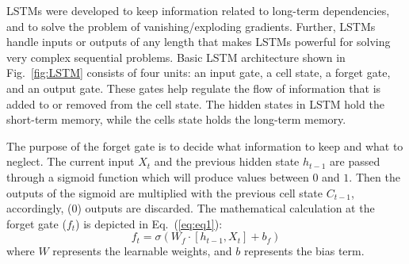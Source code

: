 LSTMs were developed to keep information related to long-term dependencies, and to solve the problem of vanishing/exploding gradients.
Further, LSTMs handle inputs or outputs of any length that makes LSTMs powerful for solving very complex sequential problems. 
Basic LSTM architecture shown in Fig.~\ref{fig:LSTM}  consists of four units: an input gate, a cell state, a forget gate, and an output gate.
These gates help regulate the flow of information that is added to or removed from the cell state. 
The hidden states in LSTM hold the short-term memory, while the cells state holds the long-term memory.  

The purpose of the forget gate is to decide what information to keep and what to neglect. 
The current input \(X_{t}\) and the previous hidden state  \(h_{t-1}\) are passed through a sigmoid function which will produce values between \(0\) and \(1\).
Then the outputs of the sigmoid are multiplied with the previous cell state \(C_{t-1}\), accordingly, (\(0\)) outputs are discarded.
The mathematical calculation at the forget gate ($f_t$) is depicted in Eq.~(\ref{eq:eq1}):
\begin{equation}
f_{t}=\sigma\left(W_{f} \cdot\left[h_{t-1}, X_{t}\right]+b_{f}\right)
\label{eq:eq1}
\end{equation}
where \(W\) represents the learnable weights, and \(b\) represents the bias term. 

